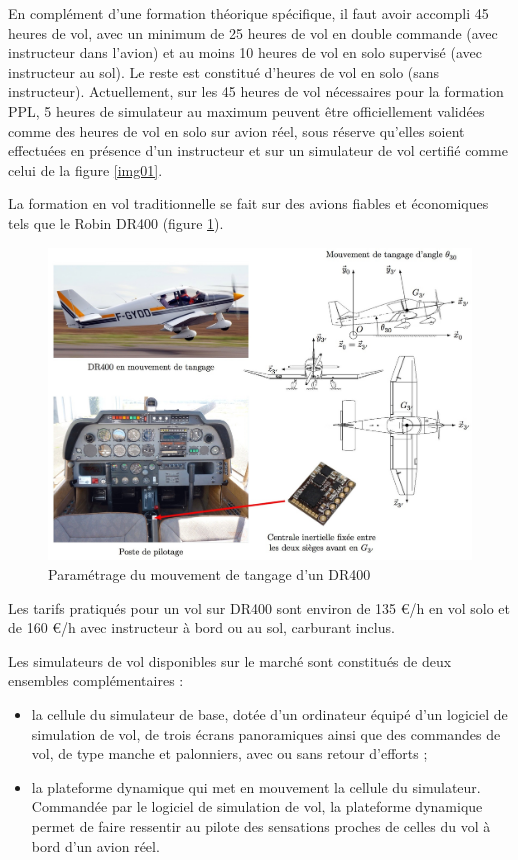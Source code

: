 En complément d'une formation théorique spécifique, il faut avoir accompli 45 heures de vol, avec un minimum de 25 heures de vol en double commande (avec instructeur dans l'avion) et au moins 10 heures de vol en solo supervisé (avec instructeur au sol). Le reste est constitué d'heures de vol en solo (sans instructeur). Actuellement, sur les 45 heures de vol nécessaires pour la formation PPL, 5 heures de simulateur au maximum peuvent être officiellement validées comme des heures de vol en solo sur avion réel, sous réserve qu'elles soient effectuées en présence d'un instructeur et sur un simulateur de vol certifié comme celui de la figure 
\ref{img01}. 

La formation en vol traditionnelle se fait sur des avions fiables et économiques tels que le Robin DR400 (figure \ref{img04}). 

\begin{figure}[!h]
 \centering\includegraphics[width=0.7\linewidth]{img/figure_4}
 \caption{Paramétrage du mouvement de tangage d'un DR400}
 \label{img04}
\end{figure}

Les tarifs pratiqués pour un vol sur DR400 sont environ de 135 \euro /h en vol solo et de 160 \euro /h avec instructeur à bord ou au sol, carburant inclus. 

Les simulateurs de vol disponibles sur le marché sont constitués de deux ensembles complémentaires : 
\begin{itemize}
 \item la cellule du simulateur de base, dotée d'un ordinateur équipé d'un logiciel de simulation de vol, de trois écrans panoramiques ainsi que des commandes de vol, de type manche et palonniers, avec ou sans retour d'efforts ; 
 \item la plateforme dynamique qui met en mouvement la cellule du simulateur. Commandée par le logiciel de simulation de vol, la plateforme dynamique permet de faire ressentir au pilote des sensations proches de celles du vol à bord d'un avion réel. 
\end{itemize}

